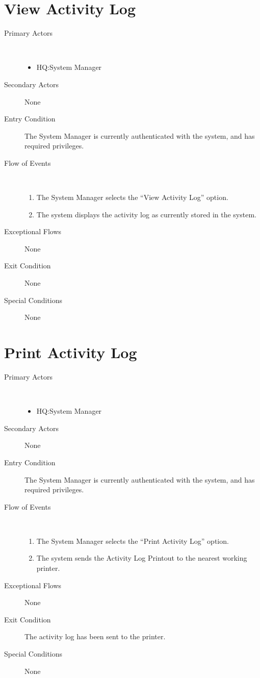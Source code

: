 \documentclass[a4paper,10pt]{report}
\begin{document}
\section{View Activity Log}
\begin{description}
\item[Primary Actors] \
  \begin{itemize}
  \item HQ:System Manager
  \end{itemize}
\item[Secondary Actors] None
\item[Entry Condition]
  The System Manager is currently authenticated with the system, and has required privileges.
\item[Flow of Events] \
  \begin{enumerate}
  \item The System Manager selects the ``View Activity Log'' option.
  \item The system displays the activity log as currently stored in the system.
  \end{enumerate}
\item[Exceptional Flows] None
\item[Exit Condition] None
\item[Special Conditions] None
\end{description}

\section{Print Activity Log}
\begin{description}
\item[Primary Actors] \
  \begin{itemize}
  \item HQ:System Manager
  \end{itemize}
\item[Secondary Actors] None
\item[Entry Condition]
  The System Manager is currently authenticated with the system, and has required privileges.
\item[Flow of Events] \
  \begin{enumerate}
  \item The System Manager selects the ``Print Activity Log'' option.
  \item The system sends the Activity Log Printout to the nearest working printer.
  \end{enumerate}
\item[Exceptional Flows] None
\item[Exit Condition]
  The activity log has been sent to the printer.
\item[Special Conditions] None
\end{description}
\end{document}
